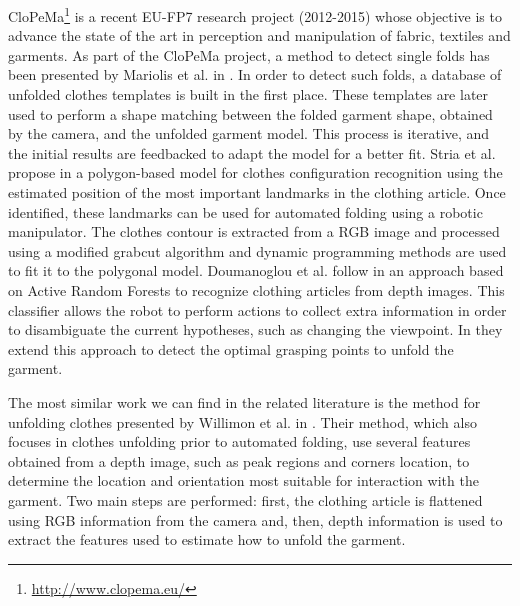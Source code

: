 CloPeMa\footnote{\url{http://www.clopema.eu/}} is a recent EU-FP7 research project (2012-2015) whose objective is to advance the state of the art in perception and manipulation of fabric, textiles and garments. As part of the CloPeMa project, a method to detect single folds has been presented by Mariolis et al. in \cite{Mariolis2013, Mariolis2015}. In order to detect such folds, a database of unfolded clothes templates is built in the first place. These templates are later used to perform a shape matching between the folded garment shape, obtained by the camera, and the unfolded garment model. This process is iterative, and the initial results are feedbacked to adapt the model for a better fit. Stria et al. propose in \cite{Stria2014, Stria2014IROS} a polygon-based model for clothes configuration recognition using the estimated position of the most important landmarks in the clothing article. Once identified, these landmarks can be used for automated folding using a robotic manipulator. The clothes contour is extracted from a RGB image and processed using a modified grabcut algorithm and dynamic programming methods are used to fit it to the polygonal model. Doumanoglou et al. follow in \cite{Doumanoglou2014ECCV} an approach based on Active Random Forests to recognize clothing articles from depth images. This classifier allows the robot to perform actions to collect extra information in order to disambiguate the current hypotheses, such as changing the viewpoint. In \cite{Doumanoglou2014ICRA} they extend this approach to detect the optimal grasping points to unfold the garment.


The most similar work we can find in the related literature is the method for unfolding clothes presented by Willimon et al. in \cite{Willimon2011}. Their method, which also focuses in clothes unfolding prior to automated folding, use several features obtained from a depth image, such as peak regions and corners location, to determine the location and orientation most suitable for interaction with the garment. Two main steps are performed: first, the clothing article is flattened using RGB information from the camera and, then, depth information is used to extract the features used to estimate how to unfold the garment.